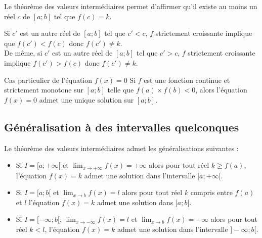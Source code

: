 \documentclass[french]{book}
\begin{document}
\begin{demo}
 Le théorème des valeurs intermédiaires permet d'affirmer qu'il existe au moins un réel $c$ de $[a;b]$ tel que $f(c)=k$.\par
Si $c'$ est un autre réel de $[a;b]$ tel que $c'<c$, $f$ strictement croissante implique que $f(c')<f(c)$ donc $f(c')\neq k$.\\
De même, si $c'$ est un autre réel de $[a;b]$ tel que $c'>c$, $f$ strictement croissante implique $f(c')>f(c)$ donc $f(c')\neq k$.
\end{demo}

\begin{rem}{Cas particulier de l'équation $f(x)=0$}
 Si $f$ est une fonction continue et strictement monotone sur $[a;b]$ telle que $f(a)\times f(b)<0$, alors l'équation $f(x)=0$ admet une unique solution sur $[a;b]$.
\end{rem}

\subsection{Généralisation à des intervalles quelconques}

\begin{prop}
Le théorème des valeurs intermédiaires admet les généralisations suivantes :

\begin{itemize}
\item[$\bullet$] Si $I=[a;+\infty[$ et $\lim_{x\rightarrow +\infty}f(x)=+\infty$ alors pour tout réel $k\geq f(a)$, l'équation $f(x)=k$ admet une solution dans l'intervalle $[a;+\infty[$.
\item[$\bullet$] Si $I=[a;b[$ et $\lim_{x\rightarrow b}f(x)=l$ alors pour tout réel $k$ compris entre $f(a)$ et $l$ l'équation $f(x)=k$ admet une solution dans $[a;b[$.
\item[$\bullet$] Si $I=[-\infty;b[$, $\lim_{x\rightarrow -\infty}f(x)=l$ et $\lim_{x\rightarrow b}f(x)=-\infty$ alors pour tout réel $k<l$, l'équation $f(x)=k$ admet une solution dans l'intervalle $]-\infty;b[$.
\end{itemize}
\end{prop}
\end{document}
